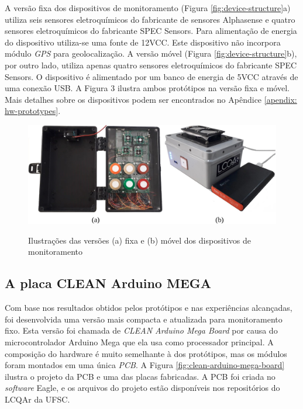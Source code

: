 A versão fixa dos dispositivos de monitoramento (Figura \ref{fig:device-structure}a) utiliza seis sensores eletroquímicos do fabricante de sensores Alphasense e quatro sensores eletroquímicos do fabricante SPEC Sensors. Para alimentação de energia do dispositivo utiliza-se uma fonte de 12VCC. Este dispositivo não incorpora módulo \textit{GPS} para geolocalização. A versão móvel (Figura \ref{fig:device-structure}b), por outro lado, utiliza apenas quatro sensores eletroquímicos do fabricante SPEC Sensors. O dispositivo é alimentado por um banco de energia de 5VCC através de uma conexão USB. A Figura 3 ilustra ambos protótipos na versão fixa e móvel. Mais detalhes sobre os dispositivos podem ser encontrados no Apêndice \ref{apendix: hw-prototypes}.

\begin{figure}
    \centering
    \caption{Ilustrações das versões (a) fixa e (b) móvel dos dispositivos de monitoramento}
    \includegraphics[width=1\linewidth]{chapters//2-CLEAN/Figuras/Monitoring Prototypes.jpg}
    \label{fig:monitoring-prototypes}
\end{figure}

\subsection{A placa CLEAN Arduino MEGA}

Com base nos resultados obtidos pelos protótipos e nas experiências alcançadas, foi desenvolvida uma versão mais compacta e atualizada para monitoramento fixo. Esta versão foi chamada de \textit{CLEAN Arduino Mega Board} por causa do microcontrolador Arduino Mega que ela usa como processador principal. A composição do hardware é muito semelhante à dos protótipos, mas os módulos foram montados em uma única \textit{PCB}. A Figura \ref{fig:clean-arduino-mega-board} ilustra o projeto da PCB e uma das placas fabricadas. A PCB foi criada no \textit{software} Eagle, e os arquivos do projeto estão disponíveis nos repositórios do LCQAr da UFSC.

